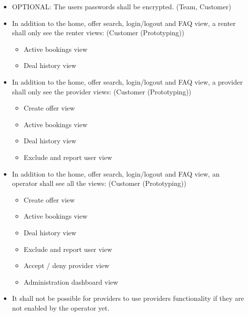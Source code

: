 \begin{itemize}
    \item OPTIONAL: The users passwords shall be encrypted. (Team, Customer)
    \item In addition to the home, offer search, login/logout and FAQ view, a renter shall only see the renter views: (Customer (Prototyping))
        \begin{itemize}
            \item Active bookings view
            \item Deal history view
        \end{itemize}
    \item In addition to the home, offer search, login/logout and FAQ view, a provider shall only see the provider views: (Customer (Prototyping))
        \begin{itemize}
            \item Create offer view
            \item Active bookings view
            \item Deal history view
            \item Exclude and report user view
        \end{itemize}
    \item In addition to the home, offer search, login/logout and FAQ view, an operator shall see all the views: (Customer (Prototyping))
        \begin{itemize}
            \item Create offer view
            \item Active bookings view
            \item Deal history view
            \item Exclude and report user view
            \item Accept / deny provider view
            \item Administration dashboard view
        \end{itemize}
    \item It shall not be possible for providers to use providers functionality if they are not enabled by the operator yet.
\end{itemize}



